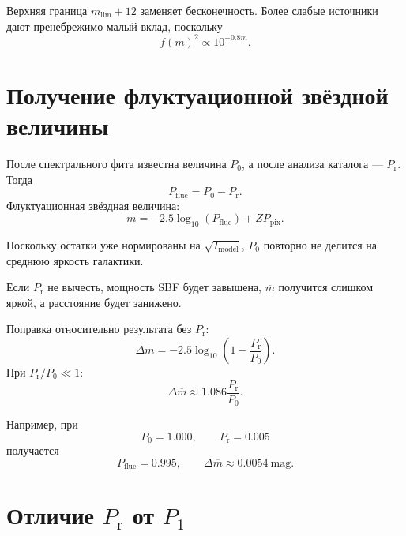 \documentclass[12pt,a4paper]{article}
\newcommand{\Prpow}{P_{\mathrm r}}
\newcommand{\Pfluc}{P_{\mathrm{fluc}}}
\begin{document}
Верхняя граница \(m_{\mathrm{lim}}+12\) заменяет
бесконечность. Более слабые источники дают пренебрежимо
малый вклад, поскольку
\begin{equation}
    f(m)^2\propto10^{-0.8m}.
\end{equation}

\section{Получение флуктуационной звёздной величины}

После спектрального фита известна величина \(P_0\), а после
анализа каталога --- \(\Prpow\). Тогда
\begin{equation}
    \Pfluc=P_0-\Prpow.
\end{equation}
Флуктуационная звёздная величина:
\begin{equation}
    \overline m =
    -2.5\log_{10}(\Pfluc)
    +ZP_{\mathrm{pix}}.
\end{equation}

Поскольку остатки уже нормированы на
\(\sqrt{I_{\mathrm{model}}}\), \(P_0\) повторно не делится
на среднюю яркость галактики.

Если \(\Prpow\) не вычесть, мощность SBF будет завышена,
\(\overline m\) получится слишком яркой, а расстояние будет
занижено.

Поправка относительно результата без \(\Prpow\):
\begin{equation}
    \Delta\overline m
    =
    -2.5\log_{10}
    \left(
        1-\frac{\Prpow}{P_0}
    \right).
\end{equation}
При \(\Prpow/P_0\ll1\):
\begin{equation}
    \Delta\overline m
    \approx
    1.086\frac{\Prpow}{P_0}.
\end{equation}

Например, при
\begin{equation}
    P_0=1.000,\qquad \Prpow=0.005
\end{equation}
получается
\begin{equation}
    \Pfluc=0.995,\qquad
    \Delta\overline m\approx0.0054~\mathrm{mag}.
\end{equation}

\section{Отличие \(\Prpow\) от \(P_1\)}
\end{document}
